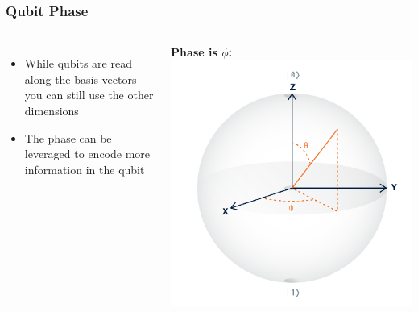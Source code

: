 \documentclass[aspectratio=169,11pt,hyperref={colorlinks=true}]{beamer}
\begin{document}
\begin{frame}
    \frametitle{Qubit Phase}
    \begin{columns}
        \begin{itemize}
            \item While qubits are read along the basis vectors you can
                still use the other dimensions
            \item The phase can be leveraged to encode more information in the qubit
        \end{itemize}
            \centering
            \textbf{Phase is $\phi$:}
            \includegraphics[height=.85\textwidth]{bloch_angles.png}
    \end{columns}
\end{frame}
\end{document}
